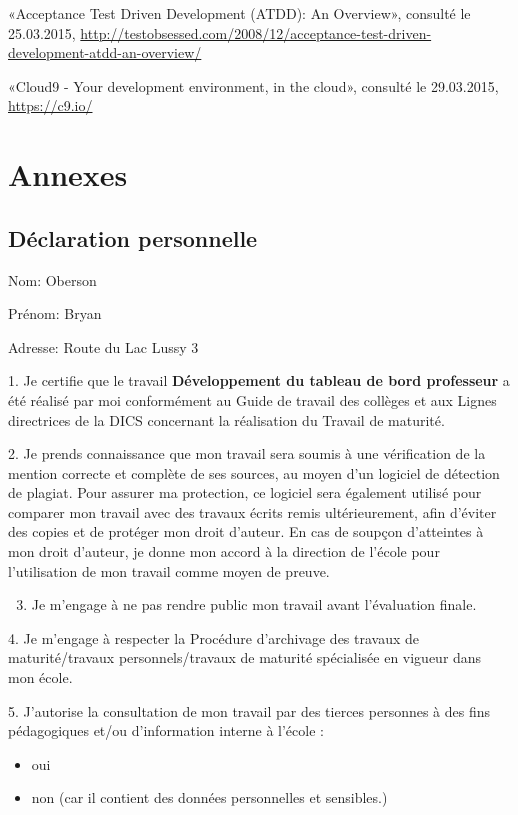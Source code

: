 \documentclass[a4paper,10pt,french]{sphinxmanual}
\begin{document}
«Acceptance Test Driven Development (ATDD): An Overview»,
consulté le 25.03.2015,
\href{http://testobsessed.com/2008/12/acceptance-test-driven-development-atdd-an-overview/}{http://testobsessed.com/2008/12/acceptance-test-driven-development-atdd-an-overview/}

«Cloud9 - Your development environment, in the cloud»,
consulté le 29.03.2015,
\href{https://c9.io/}{https://c9.io/}


\chapter{Annexes}
\label{annexes::doc}\label{annexes:annexes}

\section{Déclaration personnelle}
\label{annexes:declaration-personnelle}
Nom: Oberson

Prénom: Bryan

Adresse: Route du Lac Lussy 3

1. Je certifie que le travail
\textbf{Développement du tableau de bord professeur}
a été réalisé par moi conformément au Guide de travail des collèges et aux
Lignes directrices de la DICS concernant la réalisation du Travail de maturité.

2. Je prends connaissance que mon travail sera soumis à une vérification de la
mention correcte et complète de ses sources, au moyen d’un logiciel de détection
de plagiat. Pour assurer ma protection, ce logiciel sera également utilisé pour
comparer mon travail avec des travaux écrits remis ultérieurement, afin d’éviter
des copies et de protéger mon droit d’auteur. En cas de soupçon d’atteintes à
mon droit d’auteur, je donne mon accord à la direction de l’école pour
l’utilisation de mon travail comme moyen de preuve.
\begin{enumerate}
\setcounter{enumi}{2}
\item {} 
Je m'engage à ne pas rendre public mon travail avant l'évaluation finale.

\end{enumerate}

4. Je m’engage à respecter la Procédure d’archivage des travaux de
maturité/travaux personnels/travaux de maturité spécialisée en vigueur dans mon
école.

5. J’autorise la consultation de mon travail par des tierces personnes à des
fins pédagogiques et/ou d’information interne à l’école :
\begin{itemize}
\item {} 
oui

\item {} 
non (car il contient des données personnelles et sensibles.)

\end{itemize}
\end{document}
